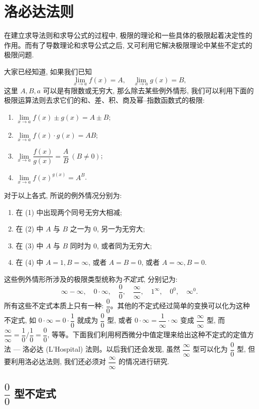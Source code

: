 \section{洛必达法则}
\label{sec:ma-5-2}

在建立求导法则和求导公式的过程中, 极限的理论和一些具体的极限起着决定性的作用。而有了导数理论和求导公式之后, 又可利用它解决极限理论中某些不定式的极限问题.

大家已经知道, 如果我们已知
\[
  \lim_{x\to a}f(x)=A,\quad \lim_{x\to a}g(x)=B,
\]
这里 $A,B,a$ 可以是有限数或无穷大, 那么除去某些例外情形, 我们可以利用下面的极限运算法则去求它们的和、差、积、商及幂--指数函数式的极限:
\begin{enumerate}
  \item $\lim\limits_{x\to a} f(x)\pm g(x)=A\pm B$;
  \item $\lim\limits_{x\to a} f(x)\cdot g(x)=AB$;
  \item $\lim\limits_{x\to a}\dfrac{f(x)}{g(x)}=\dfrac AB\ (B\ne0)$;
  \item $\lim\limits_{x\to a} f(x)^{g(x)}=A^B$.
\end{enumerate}
对于以上各式, 所说的例外情况分别为:
\begin{enumerate}
  \item[(a)] 在 (1) 中出现两个同号无穷大相减;
  \item[(b)] 在 (2) 中 $A$ 与 $B$ 之一为 $0$, 另一为无穷大;
  \item[(c)] 在 (3) 中 $A$ 与 $B$ 同时为 $0$, 或者同为无穷大;
  \item[(d)] 在 (4) 中 $A=1,B=\infty$, 或者 $A=B=0$, 或者 $A=\infty,B=0$.
\end{enumerate}
这些例外情形所涉及的极限类型统称为\emph{不定式}, 分别记为:
\[
  \infty-\infty,\quad 0\cdot\infty,\quad \frac00,\quad \frac\infty\infty,\quad 1^\infty,\quad 0^0,\quad \infty^0.
\]
所有这些不定式本质上只有一种: $\dfrac00$。其他的不定式经过简单的变换可以化为这种不定式, 如 $0\cdot\infty=0\cdot\dfrac10$ 就成为 $\dfrac00$ 型, 或者 $0\cdot\infty=\dfrac1\infty\cdot\infty$ 变成 $\dfrac\infty\infty$ 型, 而 $\dfrac\infty\infty=\dfrac10/\dfrac10=\dfrac00$, 等等。下面我们利用柯西微分中值定理来给出这种不定式的定值方法 --- 洛必达 (L'Hospital) 法则。以后我们还会发现, 虽然 $\dfrac\infty\infty$ 型可以化为 $\dfrac00$ 型, 但要利用洛必达法则, 我们还必须对 $\dfrac\infty\infty$ 的情况进行研究.

\subsection{\texorpdfstring{$\dfrac00$ 型不定式}{0/0 型不定式}}
\label{subsec:ma-5-2-1}

